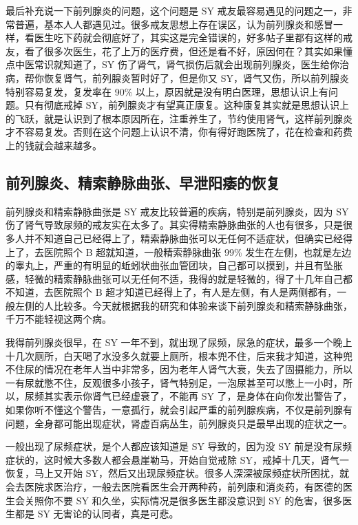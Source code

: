 \documentclass[fontset=founder]{ctexart}
\begin{document}
最后补充说一下前列腺炎的问题，这个问题是 SY 戒友最容易遇见的问题之一，非常普遍，基本人人都遇见过。很多戒友思想上存在误区，认为前列腺炎和感冒一样，看医生吃下药就会彻底好了，其实这是完全错误的，好多帖子里都有这样的戒友，看了很多次医生，花了上万的医疗费，但还是看不好，原因何在？其实如果懂点中医常识就知道了，SY 伤了肾气，肾气损伤后就会出现前列腺炎，医生给你治病，帮你恢复肾气，前列腺炎暂时好了，但是你又 SY，肾气又伤，所以前列腺炎特别容易复发，复发率在 90\% 以上，原因就是没有明白医理，思想认识上有问题。只有彻底戒掉 SY，前列腺炎才有望真正康复。这种康复其实就是思想认识上的飞跃，就是认识到了根本原因所在，注重养生了，节约使用肾气，这样前列腺炎才不容易复发。否则在这个问题上认识不清，你有得好跑医院了，花在检查和药费上的钱就会越来越多。

\subsection{前列腺炎、精索静脉曲张、早泄阳痿的恢复}

前列腺炎和精索静脉曲张是 SY 戒友比较普遍的疾病，特别是前列腺炎，因为 SY 伤了肾气导致尿频的戒友实在太多了。其实得精索静脉曲张的人也有很多，只是很多人并不知道自己已经得上了，精索静脉曲张可以无任何不适症状，但确实已经得上了，去医院照个 B 超就知道，一般精索静脉曲张 99\% 发生在左侧，也就是左边的睾丸上，严重的有明显的蚯蚓状曲张血管团块，自己都可以摸到，并且有坠胀感，轻微的精索静脉曲张可以无任何不适，我得的就是轻微的，得了十几年自己都不知道，去医院照个 B 超才知道已经得上了，有人是左侧，有人是两侧都有，一般左侧的人比较多。今天就根据我的研究和体验来谈下前列腺炎和精索静脉曲张，千万不能轻视这两个病。

我得前列腺炎很早，在 SY 一年不到，就出现了尿频，尿急的症状，最多一个晚上十几次厕所，白天喝了水没多久就要上厕所，根本兜不住，后来我才知道，这种兜不住尿的情况在老年人当中非常多，因为老年人肾气大衰，失去了固摄能力，所以一有尿就憋不住，反观很多小孩子，肾气特别足，一泡尿甚至可以憋上一小时，所以，尿频其实表示你肾气已经虚衰了，不能再 SY 了，是身体在向你发出警告了，如果你听不懂这个警告，一意孤行，就会引起严重的前列腺疾病，不仅是前列腺有问题，全身都可能出现症状，肾虚百病丛生，前列腺炎只是最早出现的症状之一。

一般出现了尿频症状，是个人都应该知道是 SY 导致的，因为没 SY 前是没有尿频症状的，这时候大多数人都会悬崖勒马，开始自觉戒除 SY，戒掉十几天，肾气一恢复，马上又开始 SY，然后又出现尿频症状。很多人深深被尿频症状所困扰，就会去医院求医治疗，一般去医院看医生会开两种药，前列康和消炎药，有医德的医生会关照你不要 SY 和久坐，实际情况是很多医生都没意识到 SY 的危害，很多医生都是 SY 无害论的认同者，真是可悲。
\end{document}
